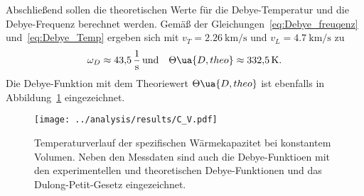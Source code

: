 Abschließend sollen die theoretischen Werte für die Debye-Temperatur und die Debye-Frequenz berechnet werden.
Gemäß der Gleichungen~\eqref{eq:Debye_freuqenz} und~\eqref{eq:Debye_Temp} ergeben sich mit $v_T = \SI{2.26}{\kilo\meter\per\second}$
und $v_L = \SI{4.7}{\kilo\meter\per\second}$ zu
\begin{equation}
        \omega_D \approx \SI{43.5}{\per\second} \, \text{und} \quad \Theta\ua{D, theo} \approx \SI{332.5}{\kelvin}.
\end{equation}
Die Debye-Funktion mit dem Theoriewert $\Theta\ua{D, theo}$ ist ebenfalls in Abbildung~\ref{fig: C_V} eingezeichnet.

\begin{figure}
\centering
\texttt{[image: ../analysis/results/C\_V.pdf]}
\caption{Temperaturverlauf der spezifischen Wärmekapazitet bei konstantem Volumen. Neben den Messdaten sind auch die
Debye-Funktioen mit den experimentellen und theoretischen Debye-Funktionen und das Dulong-Petit-Gesetz eingezeichnet.}
\label{fig: C_V}
\end{figure}


